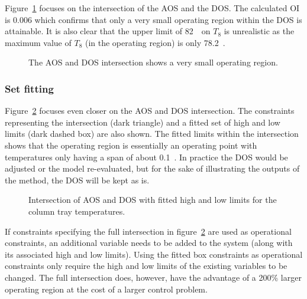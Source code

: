 Figure~\ref{fig:columnaosfocus} focuses on the intersection of the AOS and the DOS.
The calculated OI is 0.006 which confirms that only a very small operating region within the DOS is attainable.
It is also clear that the upper limit of 82~\textcelsius\ on $T_8$ is unrealistic as the maximum value of $T_8$ (in the operating region) is only 78.2~\textcelsius.

\begin{figure}[htbp]
  \centering
    \scalebox{1}{}  
  \caption[AOS and DOS intersection of the laboratory distillation column]{The AOS and DOS intersection shows a very small operating region.}
  \label{fig:columnaosfocus}
\end{figure}

\subsubsection{Set fitting}
Figure~\ref{fig:columnfitbox} focuses even closer on the AOS and DOS intersection.
The constraints representing the intersection (dark triangle) and a fitted set of high and low limits (dark dashed box) are also shown.
The fitted limits within the intersection shows that the operating region is essentially an operating point with temperatures only having a span of about 0.1~\textcelsius.
In practice the DOS would be adjusted or the model re-evaluated, but for the sake of illustrating the outputs of the method, the DOS will be kept as is.
  
\begin{figure}[htbp]
  \centering
    \scalebox{1}{}  
  \caption[Fitted constraints for the laboratory distillation column]{Intersection of AOS and DOS with fitted high and low limits for the column tray temperatures.}
  \label{fig:columnfitbox}
\end{figure}

If constraints specifying the full intersection in figure~\ref{fig:columnfitbox} are used as operational constraints, an additional variable needs to be added to the system (along with its associated high and low limits).
Using the fitted box constraints as operational constraints only require the high and low limits of the existing variables to be changed.
The full intersection does, however, have the advantage of a 200\% larger operating region at the cost of a larger control problem.

